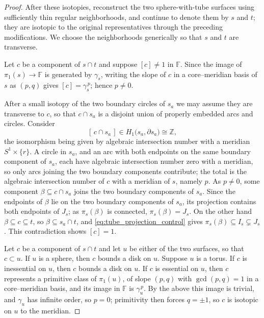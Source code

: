 \documentclass[12pt,a4paper]{amsart}
\numberwithin{equation}{section}
\newcommand{\FF}{\mathbb{F}}
\newcommand{\ZZ}{\mathbb{Z}}
\theoremstyle{plain}
\theoremstyle{definition}
\theoremstyle{remark}
\begin{document}
\begin{proof}
    After these isotopies, reconstruct the two sphere-with-tube surfaces using sufficiently thin regular neighborhoods, and continue to denote them by $s$ and $t$; they are isotopic to the original representatives through the preceding modifications.
    We choose the neighborhoods generically so that $s$ and $t$ are transverse.

    Let $c$ be a component of $s \cap t$ and suppose $[c] \neq 1$ in $\FF$.
    Since the image of $\pi_1(s) \to \FF$ is generated by $\gamma_s$, writing the slope of $c$ in a core--meridian basis of $s$ as $(p,q)$ gives $[c] = \gamma_s^{\,p}$; hence $p \neq 0$.

    After a small isotopy of the two boundary circles of $s_a$ we may assume they are transverse to $c$, so that $c \cap s_a$ is a disjoint union of properly embedded arcs and circles.
    Consider
    \[
        [\,c \cap s_a\,] \in H_1\bigl(s_a, \partial s_a\bigr) \cong \ZZ ,
    \]
    the isomorphism being given by algebraic intersection number with a meridian $S^1 \times \{r\}$.
    A circle in $s_a$, and an arc with both endpoints on the same boundary component of $s_a$, each have algebraic intersection number zero with a meridian, so only arcs joining the two boundary components contribute; the total is the algebraic intersection number of $c$ with a meridian of $s$, namely $p$.
    As $p \neq 0$, some component $\beta \subseteq c \cap s_a$ joins the two boundary components of $s_a$.
    Since the endpoints of $\beta$ lie on the two boundary components of $s_a$, its projection contains both endpoints of $J_s$; as $\pi_s(\beta)$ is connected, $\pi_s(\beta) = J_s$.
    On the other hand $\beta \subseteq c \subseteq t$, so $\beta \subseteq s_a \cap t$, and \eqref{eq:tube_projection_control} gives $\pi_s(\beta) \subseteq I_s \subsetneq J_s$.
    This contradiction shows $[c] = 1$.

    Let $c$ be a component of $s \cap t$ and let $u$ be either of the two surfaces, so that $c \subset u$.
    If $u$ is a sphere, then $c$ bounds a disk on $u$.
    Suppose $u$ is a torus.
    If $c$ is inessential on $u$, then $c$ bounds a disk on $u$.
    If $c$ is essential on $u$, then $c$ represents a primitive class of $\pi_1(u)$, of slope $(p,q)$ with $\gcd(p,q) = 1$ in a core--meridian basis, and its image in $\FF$ is $\gamma_u^{\,p}$.
    By the above this image is trivial, and $\gamma_u$ has infinite order, so $p = 0$; primitivity then forces $q = \pm 1$, so $c$ is isotopic on $u$ to the meridian.
\end{proof}
\end{document}
